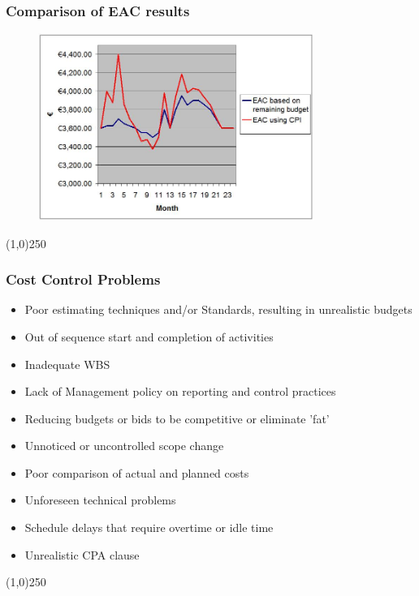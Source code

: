 \begin{frame}
\frametitle{Comparison of EAC results}
\begin{figure}
	\centering
		\includegraphics[width = 9cm]{images/compEAC.jpg}
	\label{fig:compEAC}
\end{figure}
\end{frame}
\begin{center}\line(1,0){250}\end{center}






\begin{frame}
\frametitle{Cost Control Problems}
\begin{itemize}
	\item Poor estimating techniques and/or Standards, resulting in unrealistic budgets
	\item Out of sequence start and completion of activities
	\item Inadequate WBS
	\item Lack of Management policy on reporting and control practices
	\item Reducing budgets or bids to be competitive or eliminate 'fat'
	\item Unnoticed or uncontrolled scope change
	\item Poor comparison of actual and planned costs
	\item Unforeseen technical problems
	\item Schedule delays that require overtime or idle time
	\item Unrealistic CPA clause
\end{itemize}
\end{frame}
\begin{center}\line(1,0){250}\end{center}







